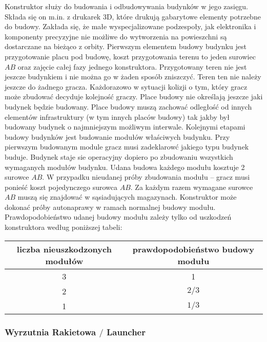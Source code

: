 \documentclass[11pt,a4paper]{article}
\begin{document}
Konstruktor służy do budowania i odbudowywania budynków w jego zasięgu. Składa się on m.in. z drukarek 3D, które drukują gabarytowe elementy potrzebne do budowy. Zakłada się, że małe wyspecjalizowane podzespoły, jak elektronika i komponenty precyzyjne nie możliwe do wytworzenia na powieszchni są dostarczane na bieżąco z orbity. Pierwszym elementem budowy budynku jest przygotowanie placu pod budowę, koszt przygotowania terenu to jeden surowiec $AB$ oraz zajęcie całej fazy jednego konstruktora. Przygotowany teren nie jest jeszcze budynkiem i nie można go w żaden sposób zniszczyć. Teren ten nie należy jeszcze do żadnego gracza. Każdorazowo w sytuacji kolizji o tym, który gracz może zbudować decyduje kolejność graczy. Place budowy nie określają jeszcze jaki budynek będzie budowany. Place budowy muszą zachować odległość od innych elementów infrastruktury (w tym innych placów budowy) tak jakby był budowany budynek o najmniejszym możliwym interwale. Kolejnymi etapami budowy budynków jest budowanie modułów właściwych budynku. Przy pierwszym budowanym module gracz musi zadeklarowć jakiego typu budynek buduje. Budynek staje sie operacyjny dopiero po zbudowaniu wszystkich wymaganych modułów budynku. Udana budowa każdego modułu kosztuje 2 surowce $AB$. W przypadku nieudanej próby zbudowania modułu -- gracz musi ponieść koszt pojedynczego surowca $AB$. Za każdym razem wymagane surowce $AB$ muszą się znajdować w sąsiadujących magazynach. Konstruktor może dokonać próby autonaprawy w ramach normalnej budowy modułu. Prawdopodobieństwo udanej budowy modułu zależy tylko od uszkodzeń konstruktora według poniższej tabeli:
\begin{center}
  \begin{tabular}{| c | c |}
    \hline
    \textbf{liczba nieuszkodzonych modułów} & \textbf{prawdopodobieństwo budowy modułu}\\
    \hline
     3 & 1 \\
    \hline
    2 & $2/3$ \\
    \hline
    1 & $1/3$ \\
    \hline
  \end{tabular}
\end{center}

\subsubsection{Wyrzutnia Rakietowa $/$ Launcher}
\end{document}
